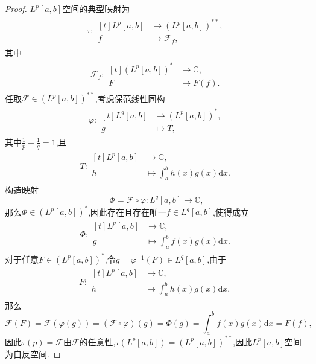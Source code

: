 \documentclass[lang = cn, scheme = chinese]{elegantbook}
\newcommand{\C}{\mathbb{C}}  		   %
\begin{document}
	\begin{proof}
		$L^p[a,b]$空间的典型映射为
		\begin{align*}
			\tau:\begin{aligned}[t]
				L^p[a,b]&\longrightarrow (L^p[a,b])^{**},\\
				f&\longmapsto \mathscr{F}_f,
			\end{aligned}
		\end{align*}
		其中
		\begin{align*}
			\mathscr{F}_f:\begin{aligned}[t]
				(L^p[a,b])^*&\longrightarrow \C,\\
				F&\longmapsto F(f).
			\end{aligned}
		\end{align*}
		任取$\mathscr{F}\in (L^p[a,b])^{**}$,考虑保范线性同构
		\begin{align*}
			\varphi:\begin{aligned}[t]
				L^q[a,b]&\longrightarrow (L^p[a,b])^*,\\
				g&\longmapsto T,
			\end{aligned}
		\end{align*}
		其中$\frac{1}{p}+\frac{1}{q}=1$,且
		\begin{align*}
			T:\begin{aligned}[t]
				L^p[a,b]&\longrightarrow \C,\\
				h&\longmapsto \int_a^b h(x)g(x)\mathrm{d}x.
			\end{aligned}
		\end{align*}
		构造映射
		$$
		\Phi=\mathscr{F}\circ\varphi:L^q[a,b]\to \C,
		$$
		那么$\Phi\in (L^p[a,b])^*$,因此存在且存在唯一$f\in L^q[a,b]$,使得成立
		\begin{align*}
			\Phi:\begin{aligned}[t]
				L^p[a,b]&\longrightarrow \C,\\
				g&\longmapsto \int_a^b f(x)g(x)\mathrm{d}x.
			\end{aligned}
		\end{align*}
		对于任意$F\in (L^p[a,b])^*$,令$g=\varphi^{-1}(F)\in L^q[a,b]$,由于
		\begin{align*}
			F:\begin{aligned}[t]
				L^p[a,b]&\longrightarrow \C,\\
				h&\longmapsto \int_a^b h(x)g(x)\mathrm{d}x,
			\end{aligned}
		\end{align*}
		那么
		$$
		\mathscr{F}(F)
		=\mathscr{F}(\varphi(g))
		=(\mathscr{F}\circ \varphi)(g)
		=\Phi(g)
		=\int_a^b f(x)g(x)\mathrm{d}x
		=F(f),
		$$
		因此$\tau(p)=\mathscr{F}$由$\mathscr{F}$的任意性,$\tau(L^p[a,b])=(L^p[a,b])^{**}$,因此$L^p[a,b]$空间为自反空间.
	\end{proof}
\end{document}
